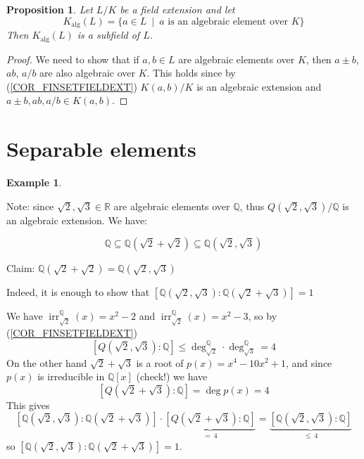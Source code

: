 \documentclass[12pt, letterpaper, oneside]{article}
\theoremstyle{plain}
\newtheorem{proposition}[theorem]{Proposition}
\theoremstyle{definition}
\newtheorem{example}[theorem]{Example}
\newcommand{\Q}{{\mathbb Q}}
\newcommand{\R}{{\mathbb R}}
\newcommand{\irr}{\operatorname{irr}}
\newcommand{\vs}{\vskip 5mm}
\begin{document}
\vs\vs


\begin{proposition}
Let $L/K$ be a field extension and let 
$$K_{\text{alg}}(L) = \{a\in L \ \mid \ a \text{ is an algebraic element over } K\}$$
Then $K_{\text{alg}}(L)$ is a subfield of $L$.
\end{proposition}


\vs

\begin{proof}
We need to show that if $a, b\in L$ are algebraic elements over $K$, then 
$a\pm b$, $ab$, $a/b$ are also algebraic over $K$. This holds since 
by (\ref{COR_FINSETFIELDEXT}) $K(a, b)/K$ is an algebraic extension and 
$a\pm b, ab, a/b \in K(a, b)$.
\end{proof}









\newpage
\section{Separable elements}
\label{SEC_SEPELTS}


\begin{example}\ 

Note: since $\sqrt{2}, \sqrt{3} \in \R$ are algebraic elements over $\Q$, thus $Q(\sqrt{2}, \sqrt{3})/\Q$
is an algebraic extension. We have:

$$\Q\subseteq \Q(\sqrt{2} + \sqrt{2}) \subseteq \Q(\sqrt{2}, \sqrt{3})$$

Claim: $\Q(\sqrt{2} + \sqrt{2}) = \Q(\sqrt{2}, \sqrt{3})$

Indeed, it is enough to show that  $[\Q(\sqrt{2}, \sqrt{3}): \Q(\sqrt{2} +  \sqrt{3})] = 1$

We have $\irr^{\Q}_{\sqrt{2}}(x) = x^{2}-2$ and  $\irr^{\Q}_{\sqrt{2}}(x) = x^{2}-3$, so by 
(\ref{COR_FINSETFIELDEXT}) 
$$[Q(\sqrt{2}, \sqrt{3}): \Q]  \leq \deg^{\Q}_{\sqrt{2}}\cdot  \deg^{\Q}_{\sqrt{3}} = 4$$
On the other hand $\sqrt{2}+ \sqrt{3}$ is a root of $p(x) = x^{4} -10x^{2} + 1$, and 
since $p(x)$ is irreducible in $\Q[x]$ (check!) we have 
$$[Q(\sqrt{2}+\sqrt{3}): \Q] = \deg p(x) = 4$$
This gives 
$$[\Q(\sqrt{2}, \sqrt{3}): \Q(\sqrt{2} +  \sqrt{3})] \cdot 
\underbrace{[Q(\sqrt{2}+\sqrt{3}): \Q]}_{= \  4} =\underbrace{[\Q(\sqrt{2}, \sqrt{3}): \Q]}_{ \leq\  4}$$
so $[\Q(\sqrt{2}, \sqrt{3}): \Q(\sqrt{2} +  \sqrt{3})] = 1$.

\end{example}
\end{document}
